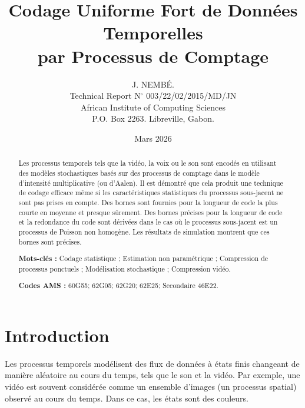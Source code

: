 \documentclass[11pt,a4paper]{article}
\begin{document}
	
	\title{\textbf{Codage Uniforme Fort de Données Temporelles \\ par Processus de Comptage}}
	\author{J. NEMB\'E. \\
		Technical Report N$^\circ$ 003/22/02/2015/MD/JN \\ 
		African Institute of Computing Sciences \\ 
		P.O. Box 2263. Libreville, Gabon.}
	\date{Mars 2026}
	
	\maketitle
	
	\begin{abstract}
		\noindent Les processus temporels tels que la vidéo, la voix ou le son sont encodés en utilisant des modèles stochastiques basés sur des processus de comptage dans le modèle d'intensité multiplicative (ou d'Aalen). Il est démontré que cela produit une technique de codage efficace même si les caractéristiques statistiques du processus sous-jacent ne sont pas prises en compte. Des bornes sont fournies pour la longueur de code la plus courte en moyenne et presque sûrement. Des bornes précises pour la longueur de code et la redondance du code sont dérivées dans le cas où le processus sous-jacent est un processus de Poisson non homogène. Les résultats de simulation montrent que ces bornes sont précises.
		
		\medskip
		\noindent \textbf{Mots-clés :} Codage statistique ; Estimation non paramétrique ; Compression de processus ponctuels ; Modélisation stochastique ; Compression vidéo.
		
		\medskip
		\noindent \textbf{Codes AMS :} 60G55; 62G05; 62G20; 62E25; Secondaire 46E22.
	\end{abstract}
	
	\tableofcontents
	\newpage
	
	\section{Introduction}
	
	Les processus temporels modélisent des flux de données à états finis changeant de manière aléatoire au cours du temps, tels que le son et la vidéo. Par exemple, une vidéo est souvent considérée comme un ensemble d'images (un processus spatial) observé au cours du temps. Dans ce cas, les états sont des couleurs.
	
\end{document}

